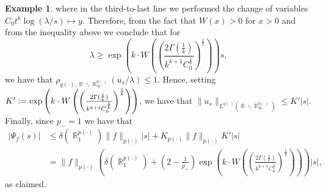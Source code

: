 \documentclass[11pt,reqno]{amsart}
\theoremstyle{definition}
\newtheorem{example}[theorem]{Example}
\theoremstyle{definition}
\theoremstyle{definition}
\DeclareMathOperator{\R}{\mathbb{R}}
\newcommand{\p}{p(\cdot)}
\newcommand{\defeq}{\vcentcolon=}
\begin{document}
\begin{example}
 where in the third-to-last line we performed the change of variables $C_0t^k\log(\lambda/s)\mapsto y$.  Therefore, from the fact that $W(x)>0$ for $x>0$ and from the inequality above we conclude that for 
 \begin{equation*}
     \lambda\geq \exp\left({k\cdot W\left(\left(\frac{2\Gamma(\frac{1}{k})}{k^{k+1}C_0^{\frac{1}{k}}}\right)^{\frac{1}{k}}\right)}\right)s,
 \end{equation*}
   we have that $\rho_{q(\cdot),\R\backslash\R_{\infty}^{q(\cdot)}}(u_s/\lambda)\leq 1$. Hence, setting $K'\defeq \exp\left({k\cdot W\left(\left(\frac{2\Gamma(\frac{1}{k})}{k^{k+1}C_0^{\frac{1}{k}}}\right)^{\frac{1}{k}}\right)}\right)$, we have that $\|u_s\|_{L^{q(\cdot)}(\R\backslash\R_{\infty}^{q(\cdot)})}\leq  K'|s|$. Finally, since $p_{-}=1$ we have that
   \begin{align*}
       |\Psi_f(s)|&\leq \delta\left(\R^{\p}_1\right)\|f\|_{\p}|s|+K_{p(\cdot)}\|f\|_{p(\cdot)}K'|s|\\
       &= \|f\|_{\p}\left(\delta\left(\R^{\p}_1\right)+\left(2-\frac{1}{p_{+}}\right)\exp\left({k\cdot W\left(\left(\frac{2\Gamma(\frac{1}{k})}{k^{k+1}C_0^{\frac{1}{k}}}\right)^{\frac{1}{k}}\right)}\right)\right)|s|,
   \end{align*}
   as claimed.
\end{example}
\end{document}
